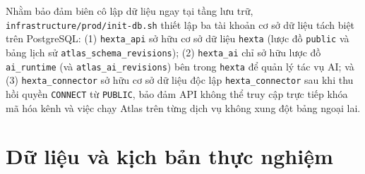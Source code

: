 Nhằm bảo đảm biên cô lập dữ liệu ngay tại tầng lưu trữ, \texttt{infrastructure/\hspace{0pt}prod/\hspace{0pt}init-\hspace{0pt}db.sh} thiết lập ba tài khoản cơ sở dữ liệu tách biệt trên PostgreSQL:
(1) \texttt{hexta\_\hspace{0pt}api} sở hữu cơ sở dữ liệu \texttt{hexta} (lược đồ \texttt{public} và bảng lịch sử \texttt{atlas\_\hspace{0pt}schema\_\hspace{0pt}revisions});
(2) \texttt{hexta\_\hspace{0pt}ai} chỉ sở hữu lược đồ \texttt{ai\_\hspace{0pt}runtime} (và \texttt{atlas\_\hspace{0pt}ai\_\hspace{0pt}revisions}) bên trong \texttt{hexta} để quản lý tác vụ AI;
và (3) \texttt{hexta\_\hspace{0pt}connector} sở hữu cơ sở dữ liệu độc lập \texttt{hexta\_\hspace{0pt}connector} sau khi thu hồi quyền \texttt{CONNECT} từ \texttt{PUBLIC}, bảo đảm API không thể truy
cập trực tiếp khóa mã hóa kênh và việc chạy Atlas trên từng dịch vụ không xung đột bảng ngoại lai.

\section{Dữ liệu và kịch bản thực nghiệm}
